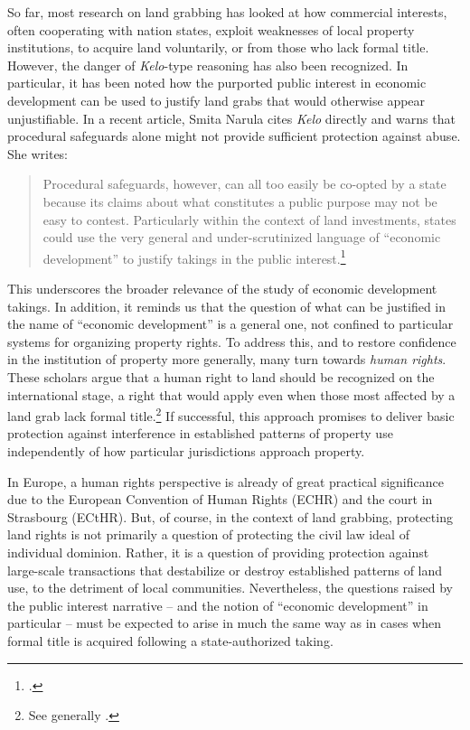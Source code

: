 \documentclass[12pt,a4paper]{book} %
\begin{document}
So far, most research on land grabbing has looked at how commercial interests, often cooperating with nation states, exploit weaknesses of local property institutions, to acquire land voluntarily, or from those who lack formal title. However, the danger of {\it Kelo}-type reasoning has also been recognized. In particular, it has been noted how the purported public interest in economic development can be used to justify land grabs that would otherwise appear unjustifiable. In a recent article, Smita Narula cites {\it Kelo} directly and warns that procedural safeguards alone might not provide sufficient protection against abuse. She writes:
\begin{quote}
Procedural safeguards, however, can all too easily be co-opted by a state because its claims about what constitutes a public purpose may not be easy to contest. Particularly within the context of land investments, states could use the very general and under-scrutinized language of ``economic development'' to justify takings in the public interest.\footcite[157]{narula13}
\end{quote}

This underscores the broader relevance of the study of economic development takings. In addition, it reminds us that the question of what can be justified in the name of ``economic development'' is a general one, not confined to particular systems for organizing property rights. To address this, and to restore confidence in the institution of property more generally, many turn towards {\it human rights}. These scholars argue that a human right to land should be recognized on the international stage, a right that would apply even when those most affected by a land grab lack formal title.\footnote{See generally \cite{schutter10,schutter11,kunnerman13}.} If successful, this approach promises to deliver basic protection against interference in established patterns of property use independently of how particular jurisdictions approach property.

In Europe, a human rights perspective is already of great practical significance due to the European Convention of Human Rights (ECHR) and the court in Strasbourg (ECtHR). But, of course, in the context of land grabbing, protecting land rights is not primarily a question of protecting the civil law ideal of individual dominion. Rather, it is a question of providing protection against large-scale transactions that destabilize or destroy established patterns of land use, to the detriment of local communities. Nevertheless, the questions raised by the public interest  narrative -- and the notion of ``economic development'' in particular -- must be expected to arise in much the same way as in cases when formal title is acquired following a state-authorized taking.
\end{document}
